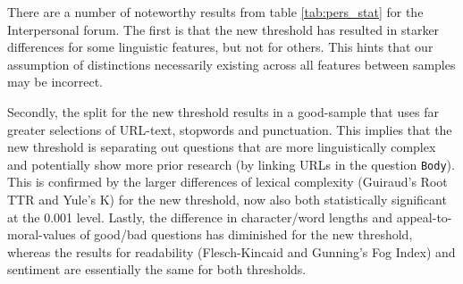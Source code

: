 \documentclass[12pt,preprint, authoryear]{article}
\numberwithin{equation}{section}
\numberwithin{figure}{section}
\numberwithin{table}{section}
\begin{document}
\normalsize

There are a number of noteworthy results from table \ref{tab:pers_stat}
for the Interpersonal forum. The first is that the new threshold has
resulted in starker differences for some linguistic features, but not
for others. This hints that our assumption of distinctions necessarily
existing across all features between samples may be incorrect.

Secondly, the split for the new threshold results in a good-sample that
uses far greater selections of URL-text, stopwords and punctuation. This
implies that the new threshold is separating out questions that are more
linguistically complex and potentially show more prior research (by
linking URLs in the question \texttt{Body}). This is confirmed by the
larger differences of lexical complexity (Guiraud's Root TTR and Yule's
K) for the new threshold, now also both statistically significant at the
0.001 level. Lastly, the difference in character/word lengths and
appeal-to-moral-values of good/bad questions has diminished for the new
threshold, whereas the results for readability (Flesch-Kincaid and
Gunning's Fog Index) and sentiment are essentially the same for both
thresholds.

\footnotesize
\end{document}
